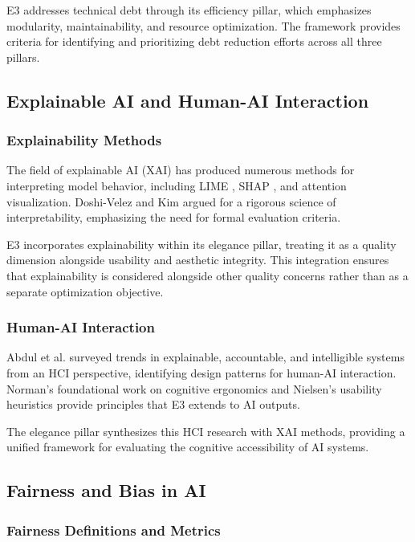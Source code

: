 E3 addresses technical debt through its efficiency pillar, which emphasizes modularity, maintainability, and resource optimization. The framework provides criteria for identifying and prioritizing debt reduction efforts across all three pillars.

\subsection{Explainable AI and Human-AI Interaction}

\subsubsection{Explainability Methods}

The field of explainable AI (XAI) has produced numerous methods for interpreting model behavior, including LIME \cite{ribeiro2016should}, SHAP \cite{lundberg2017unified}, and attention visualization. Doshi-Velez and Kim \cite{doshivelez2017towards} argued for a rigorous science of interpretability, emphasizing the need for formal evaluation criteria.

E3 incorporates explainability within its elegance pillar, treating it as a quality dimension alongside usability and aesthetic integrity. This integration ensures that explainability is considered alongside other quality concerns rather than as a separate optimization objective.

\subsubsection{Human-AI Interaction}

Abdul et al. \cite{abdul2018trends} surveyed trends in explainable, accountable, and intelligible systems from an HCI perspective, identifying design patterns for human-AI interaction. Norman's foundational work on cognitive ergonomics \cite{norman2013design} and Nielsen's usability heuristics \cite{nielsen1994enhancing} provide principles that E3 extends to AI outputs.

The elegance pillar synthesizes this HCI research with XAI methods, providing a unified framework for evaluating the cognitive accessibility of AI systems.

\subsection{Fairness and Bias in AI}

\subsubsection{Fairness Definitions and Metrics}

